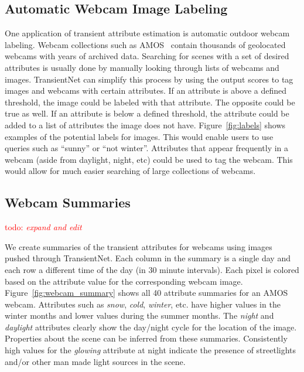 \documentclass[10pt,twocolumn,letterpaper]{article}
\newcommand{\todo}[1]{\textcolor{red}{todo: {\em #1}}}
\newcommand{\figref}[1]{Figure~\ref{fig:#1}}
\begin{document}
\subsection{Automatic Webcam Image Labeling}
\indent
One application of transient attribute estimation is automatic outdoor webcam
labeling. Webcam collections such as AMOS~\cite{jacobs07amos} contain thousands
of geolocated webcams with years of archived data.  Searching for scenes with a
set of desired attributes is usually done by manually looking through lists of
webcams and images.  TransientNet can simplify this process by using the output
scores to tag images and webcams with certain attributes.  If an attribute is
above a defined threshold, the image could be labeled with that attribute.  The
opposite could be true as well.  If an attribute is below a defined threshold,
the attribute could be added to a list of attributes the image does not have.
\figref{labels} shows examples of the potential labels for images. This would
enable users to use queries such as ``sunny'' or ``not winter''.  Attributes
that appear frequently in a webcam (aside from daylight, night, etc) could be
used to tag the webcam.  This would allow for much easier searching of large
collections of webcams.

\subsection{Webcam Summaries}
\todo{expand and edit}

We create summaries of the transient attributes for webcams using images pushed
through TransientNet.  Each column in the summary is a single day and each row
a different time of the day (in 30 minute intervals).  Each pixel is colored
based on the attribute value for the corresponding webcam image.
\figref{webcam_summary} shows all 40 attribute summaries for an AMOS webcam.
Attributes such as \textit{snow}, \textit{cold}, \textit{winter}, etc. have
higher values in the winter months and lower values during the summer months.
The \textit{night} and \textit{daylight} attributes clearly show the day/night
cycle for the location of the image.  Properties about the scene can be
inferred from these summaries.  Consistently high values for the
\textit{glowing} attribute at night indicate the presence of streetlights
and/or other man made light sources in the scene.
\end{document}
